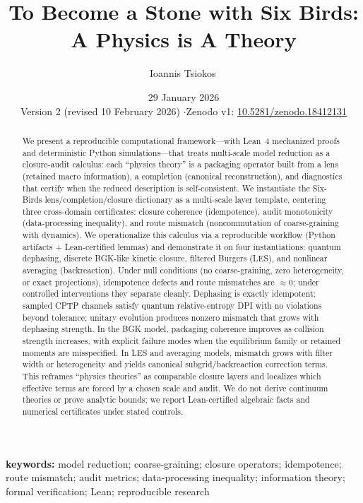 \documentclass[11pt]{article}
\title{To Become a Stone with Six Birds: A Physics is A Theory}
\author{Ioannis Tsiokos\,\orcidlink{0009-0009-7659-5964}}
\affiliation{}
\date{29 January 2026\\[4pt]{\small Version 2 (revised 10 February 2026) \quad$\cdot$\quad Zenodo v1: \href{https://doi.org/10.5281/zenodo.18412131}{10.5281/zenodo.18412131}}}
\makeatletter
\newcommand{\printaffiliation}{\begin{center}\small \@affiliation\end{center}}
\makeatother
\begin{document}
\maketitle
\thispagestyle{firstpage}
\printaffiliation

\begin{abstract}
We present a reproducible computational framework---with Lean~4 mechanized proofs and deterministic Python simulations---that treats multi-scale model reduction as a closure-audit calculus: each ``physics theory'' is a packaging operator built from a lens (retained macro information), a completion (canonical reconstruction), and diagnostics that certify when the reduced description is self-consistent. We instantiate the Six-Birds lens/completion/closure dictionary as a multi-scale layer template, centering three cross-domain certificates: closure coherence (idempotence), audit monotonicity (data-processing inequality), and route mismatch (noncommutation of coarse-graining with dynamics). We operationalize this calculus via a reproducible workflow (Python artifacts + Lean-certified lemmas) and demonstrate it on four instantiations: quantum dephasing, discrete BGK-like kinetic closure, filtered Burgers (LES), and nonlinear averaging (backreaction). Under null conditions (no coarse-graining, zero heterogeneity, or exact projections), idempotence defects and route mismatches are $\approx 0$; under controlled interventions they separate cleanly. Dephasing is exactly idempotent; sampled CPTP channels satisfy quantum relative-entropy DPI with no violations beyond tolerance; unitary evolution produces nonzero mismatch that grows with dephasing strength. In the BGK model, packaging coherence improves as collision strength increases, with explicit failure modes when the equilibrium family or retained moments are misspecified. In LES and averaging models, mismatch grows with filter width or heterogeneity and yields canonical subgrid/backreaction correction terms. This reframes ``physics theories'' as comparable closure layers and localizes which effective terms are forced by a chosen scale and audit. We do not derive continuum theories or prove analytic bounds; we report Lean-certified algebraic facts and numerical certificates under stated controls.
\end{abstract}

\vspace{1ex}
\noindent\textbf{keywords:} model reduction; coarse-graining; closure operators; idempotence; route mismatch; audit metrics; data-processing inequality; information theory; formal verification; Lean; reproducible research
\end{document}
